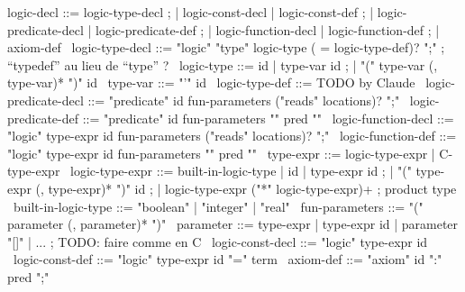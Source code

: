 \begin{syntax}
  logic-decl ::= logic-type-decl ;
          | logic-const-decl | logic-const-def ;
          | logic-predicate-decl | logic-predicate-def ;
          | logic-function-decl | logic-function-def ;
          | axiom-def
  \
  logic-type-decl ::= "logic" "type" logic-type ( = logic-type-def)? ";" ; ``typedef'' au lieu de ``type'' ?
  \
  logic-type ::= id | type-var id ;
                 | "(" type-var (, type-var)* ")" id
                 \
  type-var ::= "'" id
  \
  logic-type-def ::= TODO by Claude
  \
  logic-predicate-decl ::= "predicate" id fun-parameters ("reads" locations)? ";"
  \
  logic-predicate-def ::= "predicate" id fun-parameters "{" pred "}"
  \
  logic-function-decl ::= "logic" type-expr id fun-parameters ("reads" locations)? ";"
  \
  logic-function-def ::= "logic" type-expr id fun-parameters "{" pred "}"
  \
  type-expr ::= logic-type-expr | C-type-expr
  \
  logic-type-expr ::= built-in-logic-type | id | type-expr id ;
                 | "(" type-expr (, type-expr)* ")" id ;
                 | logic-type-expr ("*" logic-type-expr)+  ; product type
  \
  built-in-logic-type ::= "boolean" | "integer" | "real"
  \
  fun-parameters ::= "(" parameter (, parameter)* ")"
  \
  parameter ::= type-expr | type-expr id | parameter "[]" | ... ; TODO: faire comme en C
  \
  logic-const-decl ::= "logic" type-expr id
  \
  logic-const-def ::= "logic" type-expr id "=" term
  \
axiom-def ::= "axiom" id ":" pred ";"
\end{syntax}